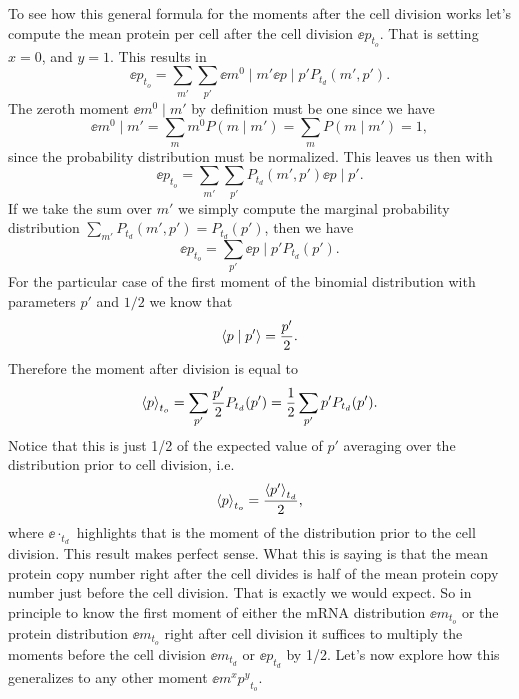 To see how this general formula for the moments after the cell division works
let's compute the mean protein per cell after the cell division $\ee{p}_{t_o}$.
That is setting $x = 0$, and $y = 1$. This results in
\begin{equation}
\ee{p}_{t_o} = \sum_{m'} \sum_{p'} \ee{m^0 \mid m'} \ee{p \mid p'} 
               P_{t_d}(m', p').
\end{equation}
The zeroth moment $\ee{m^0 \mid m'}$ by definition must be one since we have
\begin{equation}
\ee{m^0 \mid m'} = \sum_m m^0 P(m \mid m') = \sum_m P(m \mid m') = 1,
\end{equation}
since the probability distribution must be normalized. This leaves us then with
\begin{equation}
\ee{p}_{t_o} = \sum_{m'} \sum_{p'} P_{t_d}(m', p') \ee{p \mid p'}.
\end{equation}
If we take the sum over $m'$ we simply compute the marginal probability
distribution $\sum_{m'} P_{t_d}(m', p') = P_{t_d}(p')$, then we have
\begin{equation}
\ee{p}_{t_o} = \sum_{p'} \ee{p \mid p'} P_{t_d}(p').
\end{equation}
For the particular case of the first moment of the binomial distribution with
parameters $p'$ and $1/2$ we know that
\begin{equation}
\left\langle p \mid p' \right\rangle = {p' \over 2}.
\end{equation}
Therefore the moment after division is equal to
\begin{equation}
\left\langle p \right\rangle_{t_o} = \sum_{p'} {p' \over 2} P_{t_d}(p')
             = {1 \over 2} \sum_{p'} p' P_{t_d}(p').
\end{equation}
Notice that this is just 1/2 of the expected value of $p'$ averaging over the
distribution prior to cell division, i.e.
\begin{equation}
\left\langle p \right\rangle_{t_o} = {\left\langle p' \right\rangle_{t_d} \over 2},
\end{equation}
where $\ee{\cdot}_{t_d}$ highlights that is the moment of the distribution
prior to the cell division. This result makes perfect sense. What this is
saying is that the mean protein copy number right after the cell divides is
half of the mean protein copy number just before the cell division. That is
exactly we would expect. So in principle to know the first moment of either the
mRNA distribution $\ee{m}_{t_o}$ or the protein distribution $\ee{m}_{t_o}$
right after cell division it suffices to multiply the moments before the cell
division $\ee{m}_{t_d}$ or $\ee{p}_{t_d}$ by 1/2. Let's now explore how this
generalizes to any other moment $\ee{m^x p^y}_{t_o}$.

